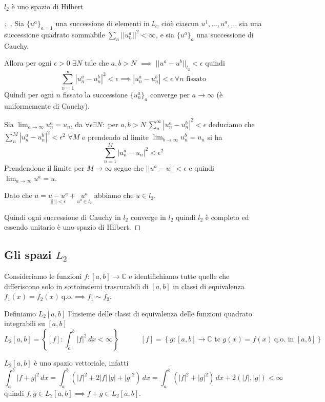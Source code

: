 \documentclass[11pt,a4paper,twoside]{book}
\newenvironment{teorema}[1][\empty]{\begin{Teorema}{
\ifx\empty#1\relax\else\mdseries\itshape#1\\\fi
}{}}{\end{Teorema}}
\newenvironment{dimo}[1][\proofname]{
	\begin{tcolorbox}[
	breakable, 
	enhanced, 
	interior hidden, 
	frame hidden, 
	borderline west = {1pt}{0pt}{gray}, 
	top=0pt, bottom=0pt, left=0pt]
\begin{proof}[#1:~]
}
{
\end{proof}
\end{tcolorbox}
}
\theoremstyle{esss}
\theoremstyle{dotless}
\numberwithin{equation}{section} %
\begin{document}
\begin{teorema}$l_2$ è uno spazio di Hilbert\end{teorema}
\begin{dimo}
Sia $\{u^a\}_{a=1}$ una successione di elementi in $l_2$, cioè ciascun $u^1,\dots,u^a,\dots$ sia una successione quadrato sommabile $\sum_n ||u^a_n||^2<\infty$, e sia $\{u^a\}_a$ una successione di Cauchy.

Allora per ogni $\epsilon>0$ $\exists N$ tale che $a,b>N$ $\implies$ $||u^a-u^b||_{l_2}<\epsilon$ quindi
\[
\sum_{n=1}^\infty \left|u_n^a-u_n^b\right|^2<\epsilon \implies \left|u_n^a-u_n^b\right|<\epsilon \>\forall n \text{ fissato}
\]
Quindi per ogni $n$ fissato la successione $\{u_n^a\}_a$ converge per $a\rightarrow\infty$ (è uniformemente di Cauchy).

Sia $\lim_{a\rightarrow\infty}u_n^a=u_n$, da $\forall\epsilon\exists N:$ per $a,b>N \>\sum_n^\infty |u_n^a-u_n^b|^2<\epsilon$ deduciamo che $\sum_n^M |u_n^a-u_n^b|^2<\epsilon^2$ $\forall M$ e prendendo al limite  $\lim_{b\rightarrow\infty}u_n^b=u_n$ si ha 
\[
\sum_{n=1}^M \left|u_n^a -u_n\right|^2<\epsilon^2
\]
Prendendone il limite per $M\rightarrow\infty$ segue che $||u^a-u||<\epsilon$ e quindi $\lim_{a\rightarrow\infty}u^a=u$.

Dato che $u=\underset{||\,||<\epsilon}{u-u^a}+\underset{u^a\in l_2}{u^a}$ abbiamo che $u\in l_2$.

Quindi ogni successione di Cauchy in $l_2$ converge in $l_2$ quindi $l_2$ è completo ed essendo unitario è uno spazio di Hilbert.\qedhere
\end{dimo}

\subsection{Gli spazi $L_2$\ }

Consideriamo le funzioni $f:[a,b]\rightarrow\mathbb{C}$ e identifichiamo tutte quelle che differiscono solo in sottoinsiemi trascurabili di $[a,b]$ in classi di equivalenza $f_1(x)=f_2(x)\>\text{q.o.}\implies f_1\sim f_2$.

Definiamo $L_2[a,b]$ l'insieme delle classi di equivalenza delle funzioni quadrato integrabili su $[a,b]$
\[
L_2[a,b]=\left\{[f]:\int_a^b |f|^2\,dx<\infty\right\}\qquad\quad [f]=\left\{g:[a,b]\rightarrow\mathbb{C}\text{ tc }g(x)=f(x)\>\text{q.o. in }[a,b]\right\}
\]

$L_2[a,b]$ è uno spazio vettoriale, infatti 
\[
\int_a^b |f+g|^2\,dx=\int_a^b (|f|^2+2|f|\,|g|+|g|^2)\,dx=\int_a^b (|f|^2+|g|^2)\,dx+2(|f|,|g|)<\infty
\] 
quindi $f,g\in L_2[a,b]\implies f+g\in L_2[a,b]$.
\end{document}
